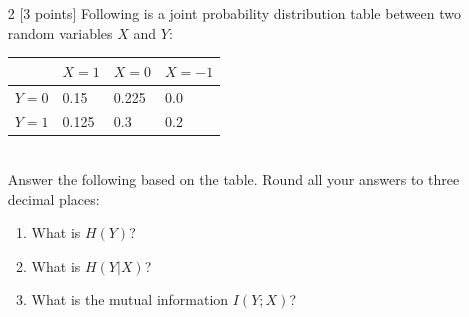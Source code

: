 \documentclass[11pt]{article}
\numberwithin{equation}{section} %
\numberwithin{figure}{section} %
\numberwithin{table}{section} %
\begin{document}
\begin{enumerate}
    \item[2] [3 points] Following is a joint probability distribution table between two random variables $X$ and $Y$:\\
        \begin{tabular}{|l|l|l|l|}
        \hline
                  & $X=1$ & $X=0$ & $X=-1$ \\ \hline
        $Y=0$ & 0.15      & 0.225     & 0.0        \\ \hline
        $Y=1$ & 0.125     & 0.3       & 0.2        \\ \hline
        \end{tabular} \\
    Answer the following based on the table. Round all your answers to three decimal places:\\
    \begin{enumerate}
        \item What is $H(Y)$?
        \begin{tcolorbox}[fit,height=0.7cm, width=0.3\linewidth, blank, borderline={1pt}{1pt}]
        \end{tcolorbox}
        \item What is $H(Y|X)$?
        \begin{tcolorbox}[fit,height=0.7cm, width=0.3\linewidth, blank, borderline={1pt}{1pt}]
        \end{tcolorbox}
        \item What is the mutual information $I(Y;X)$?
        \begin{tcolorbox}[fit,height=0.7cm, width=0.3\linewidth, blank, borderline={1pt}{1pt}]
        \end{tcolorbox}
    \end{enumerate}
    

\end{enumerate}
\end{document}
